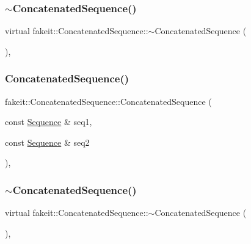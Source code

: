 \subsubsection{\texorpdfstring{$\sim$ConcatenatedSequence()}{~ConcatenatedSequence()}\hspace{0.1cm}{\footnotesize\ttfamily [6/9]}}
{\footnotesize\ttfamily virtual fakeit\+::\+Concatenated\+Sequence\+::$\sim$\+Concatenated\+Sequence (\begin{DoxyParamCaption}{ }\end{DoxyParamCaption})\hspace{0.3cm}{\ttfamily [inline]}, {\ttfamily [virtual]}}

\mbox{\label{classfakeit_1_1ConcatenatedSequence_abd7ca3783b69358f0ff4c15b970b01d0}} 
\subsubsection{\texorpdfstring{ConcatenatedSequence()}{ConcatenatedSequence()}\hspace{0.1cm}{\footnotesize\ttfamily [7/9]}}
{\footnotesize\ttfamily fakeit\+::\+Concatenated\+Sequence\+::\+Concatenated\+Sequence (\begin{DoxyParamCaption}\item[{const \mbox{\hyperlink{classfakeit_1_1Sequence}{Sequence}} \&}]{seq1,  }\item[{const \mbox{\hyperlink{classfakeit_1_1Sequence}{Sequence}} \&}]{seq2 }\end{DoxyParamCaption})\hspace{0.3cm}{\ttfamily [inline]}, {\ttfamily [protected]}}

\mbox{\label{classfakeit_1_1ConcatenatedSequence_a22346ae8c3c2af91f26144338750be25}} 
\subsubsection{\texorpdfstring{$\sim$ConcatenatedSequence()}{~ConcatenatedSequence()}\hspace{0.1cm}{\footnotesize\ttfamily [7/9]}}
{\footnotesize\ttfamily virtual fakeit\+::\+Concatenated\+Sequence\+::$\sim$\+Concatenated\+Sequence (\begin{DoxyParamCaption}{ }\end{DoxyParamCaption})\hspace{0.3cm}{\ttfamily [inline]}, {\ttfamily [virtual]}}

